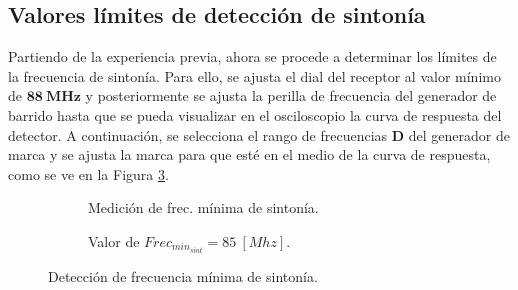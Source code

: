   \subsection{Valores límites de detección de sintonía}

    Partiendo de la experiencia previa, ahora se procede a determinar los límites de la frecuencia 
    de sintonía. Para ello, se ajusta el dial del receptor al valor mínimo de 
    \(\mathbf{88~MHz}\) y posteriormente se ajusta la perilla de frecuencia del generador 
    de barrido hasta que se pueda visualizar en el osciloscopio la curva de respuesta 
    del detector. A continuación, se selecciona el rango de frecuencias \textbf{D} 
    del generador de marca y se ajusta la marca para que esté en el medio de la 
    curva de respuesta, como se ve en la Figura \ref{fig:FrecMintSint}.   
      \begin{figure}[H]
        \centering
        \begin{subfigure}[ht]{0.48\textwidth}
          \caption{Medición de frec. mínima de sintonía.}
          \label{fig:FrecMinSintConGen}
        \end{subfigure}
        \hfill 
        \begin{subfigure}[ht]{0.48\textwidth}
          \caption{Valor de  \(Frec_{min_{sint}} = 85~[Mhz]\).}
          \label{fig:FrecMinSintValor}
        \end{subfigure}
        \caption{Detección de frecuencia mínima de sintonía.}
        \label{fig:FrecMintSint}
      \end{figure}

